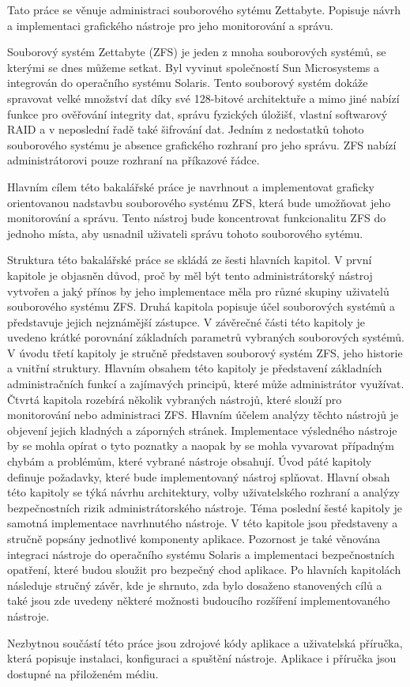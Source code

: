 Tato práce se věnuje administraci souborového sytému Zettabyte. Popisuje návrh a implementaci grafického nástroje pro jeho monitorování a správu.

Souborový systém Zettabyte (ZFS) je jeden z mnoha souborových systémů, se kterými se dnes můžeme setkat.
Byl vyvinut společností Sun Microsystems a integrován do operačního systému Solaris. Tento souborový systém dokáže spravovat velké množství dat díky své 128-bitové architektuře a mimo jiné nabízí funkce pro ověřování integrity dat, správu fyzických úložišť, vlastní softwarový RAID a v neposlední
řadě také šifrování dat. Jedním z nedostatků tohoto souborového systému je absence grafického rozhraní pro jeho správu. ZFS nabízí administrátorovi pouze rozhraní na příkazové řádce.

Hlavním cílem této bakalářské práce je navrhnout a implementovat graficky orientovanou nadstavbu souborového systému ZFS, která bude umožňovat jeho monitorování a správu. Tento nástroj bude koncentrovat funkcionalitu ZFS do jednoho místa, aby usnadnil uživateli správu tohoto souborového sytému.

Struktura této bakalářské práce se skládá ze šesti hlavních kapitol.
V první kapitole je objasněn důvod, proč by měl být tento administrátorský nástroj vytvořen a jaký přínos by jeho implementace měla pro různé skupiny uživatelů souborového systému ZFS.
Druhá kapitola popisuje účel souborových systémů a představuje jejich nejznámější zástupce. V závěrečné části této kapitoly je uvedeno krátké porovnání základních parametrů vybraných souborových systémů.
V úvodu třetí kapitoly je stručně představen souborový systém ZFS, jeho historie a vnitřní struktury. Hlavním obsahem této kapitoly je představení základních administračních funkcí a zajímavých principů, které může administrátor využívat.
Čtvrtá kapitola rozebírá několik vybraných nástrojů, které slouží pro monitorování nebo administraci ZFS. Hlavním účelem analýzy těchto nástrojů je objevení jejich kladných a záporných stránek. Implementace výsledného nástroje by se mohla opírat o tyto poznatky a naopak by se mohla vyvarovat případným chybám a problémům, které vybrané nástroje obsahují.
Úvod páté kapitoly definuje požadavky, které bude implementovaný nástroj splňovat. Hlavní obsah této kapitoly se týká návrhu architektury, volby uživatelského rozhraní a analýzy bezpečnostních rizik administrátorského nástroje.
Téma poslední šesté kapitoly je samotná implementace navrhnutého nástroje. V této kapitole jsou představeny a stručně popsány jednotlivé komponenty aplikace. Pozornost je také věnována integraci nástroje do operačního systému Solaris a implementaci bezpečnostních opatření, které budou sloužit pro bezpečný chod aplikace.
Po hlavních kapitolách následuje stručný závěr, kde je shrnuto, zda bylo dosaženo stanovených cílů a také jsou zde uvedeny některé možnosti budoucího rozšíření implementovaného nástroje.

Nezbytnou součástí této práce jsou zdrojové kódy aplikace a uživatelská příručka, která popisuje instalaci, konfiguraci a spuštění nástroje. Aplikace i příručka jsou dostupné na přiloženém médiu.




